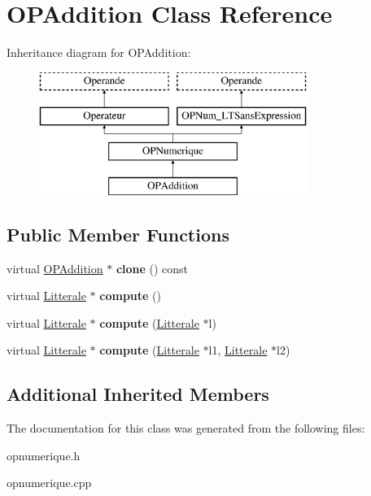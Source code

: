 \hypertarget{class_o_p_addition}{}\section{O\+P\+Addition Class Reference}
\label{class_o_p_addition}
Inheritance diagram for O\+P\+Addition\+:\begin{figure}[H]
\begin{center}
\leavevmode
\includegraphics[height=4.000000cm]{class_o_p_addition}
\end{center}
\end{figure}
\subsection*{Public Member Functions}
\begin{DoxyCompactItemize}
\item 
virtual \hyperlink{class_o_p_addition}{O\+P\+Addition} $\ast$ {\bfseries clone} () const \hypertarget{class_o_p_addition_ab1d9b58d91b92f98e6c362630eddb9a9}{}\label{class_o_p_addition_ab1d9b58d91b92f98e6c362630eddb9a9}

\item 
virtual \hyperlink{class_litterale}{Litterale} $\ast$ {\bfseries compute} ()\hypertarget{class_o_p_addition_a55b0a7e511f20228d3ed360e6e50efa6}{}\label{class_o_p_addition_a55b0a7e511f20228d3ed360e6e50efa6}

\item 
virtual \hyperlink{class_litterale}{Litterale} $\ast$ {\bfseries compute} (\hyperlink{class_litterale}{Litterale} $\ast$l)\hypertarget{class_o_p_addition_ae700f6d3003aff66ac2972ff8b1a6398}{}\label{class_o_p_addition_ae700f6d3003aff66ac2972ff8b1a6398}

\item 
virtual \hyperlink{class_litterale}{Litterale} $\ast$ {\bfseries compute} (\hyperlink{class_litterale}{Litterale} $\ast$l1, \hyperlink{class_litterale}{Litterale} $\ast$l2)\hypertarget{class_o_p_addition_a37b7577267559130d0e7da6f4842e65a}{}\label{class_o_p_addition_a37b7577267559130d0e7da6f4842e65a}

\end{DoxyCompactItemize}
\subsection*{Additional Inherited Members}


The documentation for this class was generated from the following files\+:\begin{DoxyCompactItemize}
\item 
opnumerique.\+h\item 
opnumerique.\+cpp\end{DoxyCompactItemize}
